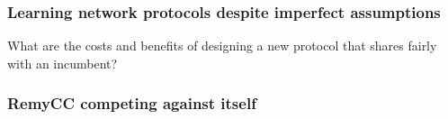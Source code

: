 \begin{frame}
\frametitle{Learning network protocols despite imperfect assumptions}
\begin{centering}
What are the costs and benefits of designing a new protocol that shares fairly with an incumbent?
\end{centering}
\end{frame}

\begin{frame}
\frametitle{RemyCC competing against itself}
\begin{centering}

\noindent {}

\end{centering}
\end{frame}

